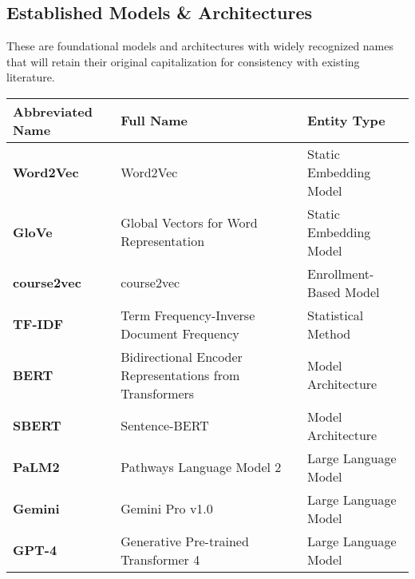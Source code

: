 \documentclass[11pt]{article}
\begin{document}
\subsection*{Established Models \& Architectures}
These are foundational models and architectures with widely recognized names that will retain their original capitalization for consistency with existing literature.
\begin{table}[h!]
\centering
\begin{tabular}{@{}p{}p{}p{}@{}}
\toprule
\textbf{Abbreviated Name} & \textbf{Full Name}                                      & \textbf{Entity Type}         \\ \midrule
\textbf{Word2Vec}         & Word2Vec                                                & Static Embedding Model     \\
\textbf{GloVe}            & Global Vectors for Word Representation                  & Static Embedding Model     \\
\textbf{course2vec}       & course2vec                                              & Enrollment-Based Model     \\
\textbf{TF-IDF}           & Term Frequency-Inverse Document Frequency               & Statistical Method         \\
\textbf{BERT}             & Bidirectional Encoder Representations from Transformers & Model Architecture         \\
\textbf{SBERT}            & Sentence-BERT                                           & Model Architecture         \\
\textbf{PaLM2}            & Pathways Language Model 2                               & Large Language Model       \\
\textbf{Gemini}           & Gemini Pro v1.0                                         & Large Language Model       \\
\textbf{GPT-4}            & Generative Pre-trained Transformer 4                    & Large Language Model       \\ \bottomrule
\end{tabular}
\end{table}
\end{document}
